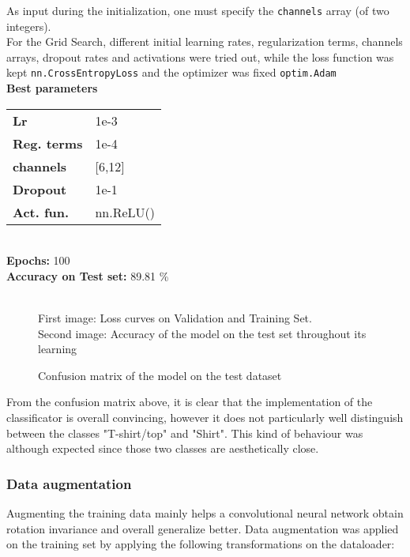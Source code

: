 \documentclass[11pt,a4paper,twocolumn]{IEEEtran}
\newcommand{\thinsepline}{\noindent\makebox[\linewidth]{\rule{7.5cm}{0.02pt}}}
\newcommand{\thinnersepline}{\noindent\makebox[\linewidth]{\rule{7.5cm}{0.01pt}}}
\begin{document}
			As input during the initialization, one must specify the \texttt{channels} array (of two integers).\medskip\\
			For the Grid Search, different initial learning rates, regularization terms, channels arrays, dropout rates and activations were tried out, while the loss function was kept \texttt{nn.CrossEntropyLoss} and the optimizer was fixed \texttt{optim.Adam}
			\thinsepline\\
			\textbf{Best parameters}\medskip\\
			\begin{tabular}{ll}
				\textbf{Lr}	& 1e-3 \\
				\textbf{Reg. terms}	& 1e-4 \\
				\textbf{channels} & [6,12] \\
				\textbf{Dropout} & 1e-1 \\
				\textbf{Act. fun.} & nn.ReLU() \\
			\end{tabular}
			\thinnersepline\\
			\textbf{Epochs:} 100\\
			\textbf{Accuracy on Test set:} 89.81 \%\vspace*{-.2cm}\\
			\thinsepline\vspace*{-.7cm}\\
			\newpage
			\begin{figure}[h]
				\centering
				
				\caption{First image: Loss curves on Validation and Training Set.\\ Second image: Accuracy of the model on the test set throughout its learning}
			\end{figure}
			\begin{figure}[h]
				\centering
				
				\caption{Confusion matrix of the model on the test dataset}
			\end{figure}
			From the confusion matrix above, it is clear that the implementation of the classificator is overall convincing, however it does not particularly well distinguish between the classes "T-shirt/top" and "Shirt". This kind of behaviour was although expected since those two classes are aesthetically close.
			\subsubsection{Data augmentation}
			Augmenting the training data mainly helps a convolutional neural network obtain rotation invariance and  overall generalize better.
			Data augmentation was applied on the training set by applying the following transformations on the dataloader:\\
				
\end{document}

